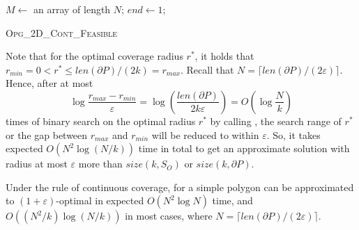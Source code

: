 \begin{algorithm}[H]
  \begin{small}
  \DontPrintSemicolon
  \vspace{2mm}

   {\Return{\True}}
  \vspace{1.5mm}

  \vspace{1.5mm}

  $M\leftarrow$ an array of length $N$; $end\leftarrow 1$;\;
  \vspace{1.5mm}

  \vspace{1.5mm}

  \vspace{1.5mm}

  \Return{\False}
  \end{small}
  \caption{\textsc{Opg\_2D\_Cont\_Feasible}}\label{algo:osg-cont}
\end{algorithm}



Note that for the optimal coverage radius $r^*$, it holds that $r_{min} = 
0 < r^* \leq {len(\partial P)}/({2k}) = r_{max}$. 
Recall that $N=\lceil len(\partial P)/(2\varepsilon)\rceil$.
Hence, after at most 
\[
  \log\frac{r_{max} - r_{min}}{\varepsilon} = \log(\frac{len(\partial P)}{2k\varepsilon})  = O(\log\frac{N}{k} )
\]
times of binary search on the optimal radius $r^*$ by calling \algoptfeasi, 
the search range of $r^*$ or the gap between $r_{max}$ and $r_{min}$ will 
be reduced to within $\varepsilon$. So, it takes expected $O(N^2 \log (N/k))$ 
time in total to get an approximate solution with radius at most $\varepsilon$ 
more than $size(k, S_O)$ or $size(k, \partial P)$.
\begin{theorem}%
    Under the rule of continuous coverage, \opgt for a simple 
		polygon can be approximated to $(1 + \varepsilon)$-optimal in expected 
		$O(N^2\log N)$ time, and $O(({N^2}/{k} )\log(N/k))$ in most cases,
    where $N=\lceil{len(\partial P)}/({2\varepsilon})\rceil$.
\end{theorem}

